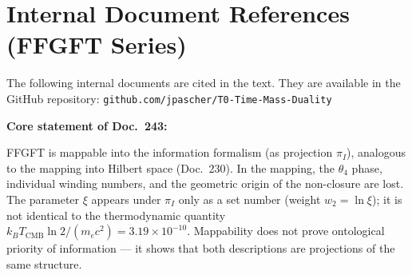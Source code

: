\section*{Internal Document References (FFGFT Series)}

The following internal documents are cited in the text. They are available
in the GitHub repository:
\texttt{github.com/jpascher/T0-Time-Mass-Duality}

\begin{center}
\renewcommand{\arraystretch}{1.3}
{\small
{}
}
\end{center}

\begin{keyresult}
  \textbf{Core statement of Doc.~243:}

  FFGFT is mappable into the information formalism (as projection
  $\pi_I$), analogous to the mapping into Hilbert space (Doc.~230).
  In the mapping, the $\theta_4$ phase, individual winding numbers,
  and the geometric origin of the non-closure are lost. The parameter
  $\xi$ appears under $\pi_I$ only as a set number (weight $w_2 = \ln\xi$);
  it is not identical to the thermodynamic quantity
  $k_BT_\text{CMB}\ln2/(m_ec^2) = 3.19\times10^{-10}$. Mappability does not prove
  ontological priority of information --- it shows that both descriptions
  are projections of the same structure.
\end{keyresult}
